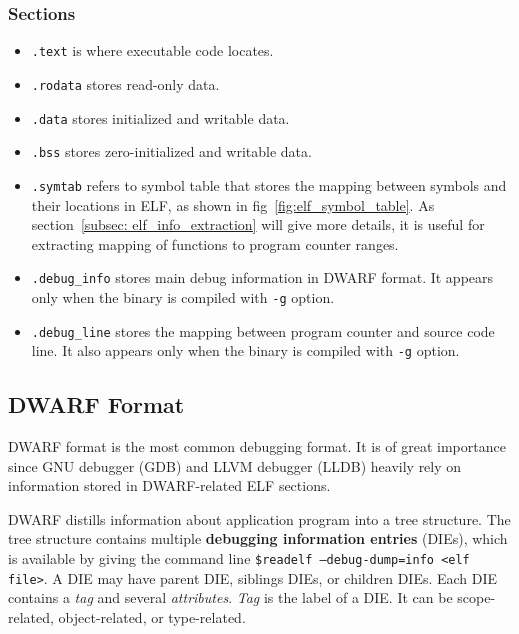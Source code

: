 \subsubsection{Sections}

\begin{itemize}
    \item \texttt{.text} is where executable code locates.
    \item \texttt{.rodata} stores read-only data.
    \item \texttt{.data} stores initialized and writable data.
    \item \texttt{.bss} stores zero-initialized and writable data.
    \item \texttt{.symtab} refers to symbol table that stores the mapping between symbols and their locations in ELF, as shown in fig~\ref{fig:elf_symbol_table}. As section~\ref{subsec: elf_info_extraction} will give more details, it is useful for extracting mapping of functions to program counter ranges.
    \item \texttt{.debug\_info} stores main debug information in DWARF format. It appears only when the binary is compiled with \texttt{-g} option.
    \item \texttt{.debug\_line} stores the mapping between program counter and source code line. It also appears only when the binary is compiled with \texttt{-g} option.
\end{itemize}

\subsection{DWARF Format}
DWARF format is the most common debugging format. It is of great importance since GNU debugger (GDB) and LLVM debugger (LLDB) heavily rely on information stored in DWARF-related ELF sections.

DWARF distills information about application program into a tree structure. The tree structure contains multiple \textbf{debugging information entries} (DIEs), which is available by giving the command line \texttt{\$readelf --debug-dump=info <elf file>}. A DIE may have parent DIE, siblings DIEs, or children DIEs. Each DIE contains a \textit{tag} and several \textit{attributes}. \textit{Tag} is the label of a DIE. It can be scope-related, object-related, or type-related. 

